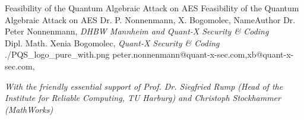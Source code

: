 \documentclass[a4paper,11pt]{article}
\begin{document}
\setcounter{footnote}{0}
\setcounter{figure}{0}
\setcounter{MaxMatrixCols}{20}



\Aufsatz 
{Feasibility of the Quantum Algebraic Attack on AES}
{Feasibility  of the Quantum Algebraic Attack on AES}
{Dr. P. Nonnenmann, X. Bogomolec,}
{NameAuthor}
{Dr. Peter Nonnenmann,
{\small \textit{DHBW Mannheim and Quant-X Security {\&} Coding}} \\
Dipl. Math. Xenia Bogomolec, 
{\small \textit{Quant-X Security {\&} Coding}} \\}
{./PQS_logo_pure_with.png}
{peter.nonnenmann@quant-x-sec.com,xb@quant-x-sec.com,} 

\noindent
{\small \textit{With the friendly essential support of Prof. Dr. Siegfried Rump (Head of the Institute for Reliable Computing, TU Harburg) and Christoph Stockhammer (MathWorks)}}
\end{document}
